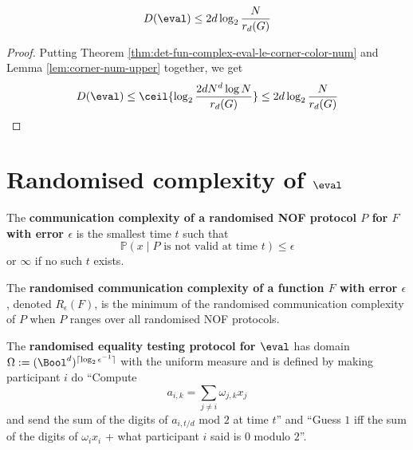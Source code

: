 \begin{corollary}
  \label{cor:det-fun-complex-eval-le-corner-free-num}

  $$D(\eval) \le 2d\log_2\frac N{r_d(G)}$$ %
\end{corollary}
\begin{proof}

  Putting Theorem \ref{thm:det-fun-complex-eval-le-corner-color-num} and Lemma \ref{lem:corner-num-upper} together, we get
  $$D(\eval) \le \ceil{\log_2\frac{2dN^d\log N}{r_d(G)}} \le 2d\log_2\frac N{r_d(G)}$$
\end{proof}


\chapter{Randomised complexity of \texorpdfstring{$\eval$}{eval}}

\begin{definition}
  \label{def:rand-protocol-complex}

  The {\bf communication complexity of a randomised NOF protocol $P$ for $F$ with error $\epsilon$} is the smallest time $t$ such that
  $$\mathbb P(x \mid P \text{ is not valid at time } t) \le \epsilon$$
  or $\infty$ if no such $t$ exists.
\end{definition}

\begin{definition}
  \label{def:rand-complex}

  The {\bf randomised communication complexity of a function $F$ with error $\epsilon$}, denoted $R_\epsilon(F)$, is the minimum of the randomised communication complexity of $P$ when $P$ ranges over all randomised NOF protocols.
\end{definition}

\begin{definition}
  \label{def:rand-eq-test-protocol-eval}

  The {\bf randomised equality testing protocol for $\eval$} has domain $\Omega := (\Bool^d)^{\lceil\log_2\epsilon^{-1}\rceil}$ with the uniform measure and is defined by making participant $i$ do ``Compute $$a_{i, k} = \sum_{j \ne i} \omega_{j, k}x_j$$ and send the sum of the digits of $a_{i, t/d}$ mod $2$ at time $t$'' and ``Guess $1$ iff the sum of the digits of $\omega_i x_i$ + what participant $i$ said is $0$ modulo $2$''.
\end{definition}


